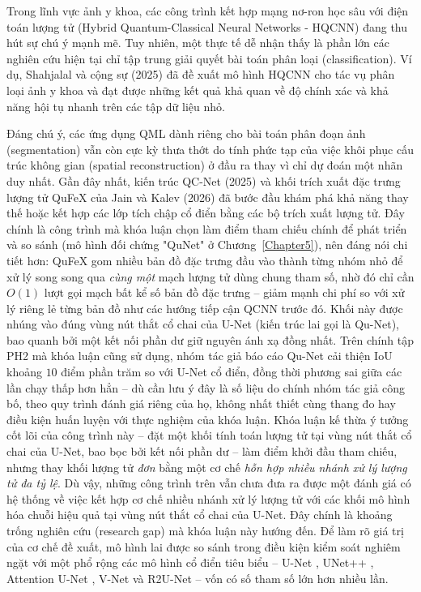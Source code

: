 Trong lĩnh vực ảnh y khoa, các công trình kết hợp mạng nơ-ron học sâu với điện toán lượng tử (Hybrid Quantum-Classical Neural Networks - HQCNN) đang thu hút sự chú ý mạnh mẽ. Tuy nhiên, một thực tế dễ nhận thấy là phần lớn các nghiên cứu hiện tại chỉ tập trung giải quyết bài toán phân loại (classification). Ví dụ, Shahjalal và cộng sự (2025) \cite{shahjalal2025hqcnn} đã đề xuất mô hình HQCNN cho tác vụ phân loại ảnh y khoa và đạt được những kết quả khả quan về độ chính xác và khả năng hội tụ nhanh trên các tập dữ liệu nhỏ.

Đáng chú ý, các ứng dụng QML dành riêng cho bài toán phân đoạn ảnh (segmentation) vẫn còn cực kỳ thưa thớt do tính phức tạp của việc khôi phục cấu trúc không gian (spatial reconstruction) ở đầu ra thay vì chỉ dự đoán một nhãn duy nhất. Gần đây nhất, kiến trúc QC-Net (2025) \cite{long2025qcq} và khối trích xuất đặc trưng lượng tử QuFeX của Jain và Kalev (2026) \cite{qufex2025} đã bước đầu khám phá khả năng thay thế hoặc kết hợp các lớp tích chập cổ điển bằng các bộ trích xuất lượng tử. Đây chính là công trình mà khóa luận chọn làm điểm tham chiếu chính để phát triển và so sánh (mô hình đối chứng "QuNet" ở Chương~\ref{Chapter5}), nên đáng nói chi tiết hơn: QuFeX gom nhiều bản đồ đặc trưng đầu vào thành từng nhóm nhỏ để xử lý song song qua \emph{cùng một} mạch lượng tử dùng chung tham số, nhờ đó chỉ cần $O(1)$ lượt gọi mạch bất kể số bản đồ đặc trưng -- giảm mạnh chi phí so với xử lý riêng lẻ từng bản đồ như các hướng tiếp cận QCNN trước đó. Khối này được nhúng vào đúng vùng nút thắt cổ chai của U-Net (kiến trúc lai gọi là Qu-Net), bao quanh bởi một kết nối phần dư giữ nguyên ánh xạ đồng nhất. Trên chính tập PH2 mà khóa luận cũng sử dụng, nhóm tác giả báo cáo Qu-Net cải thiện IoU khoảng $10$ điểm phần trăm so với U-Net cổ điển, đồng thời phương sai giữa các lần chạy thấp hơn hẳn -- dù cần lưu ý đây là số liệu do chính nhóm tác giả công bố, theo quy trình đánh giá riêng của họ, không nhất thiết cùng thang đo hay điều kiện huấn luyện với thực nghiệm của khóa luận. Khóa luận kế thừa ý tưởng cốt lõi của công trình này -- đặt một khối tính toán lượng tử tại vùng nút thắt cổ chai của U-Net, bao bọc bởi kết nối phần dư -- làm điểm khởi đầu tham chiếu, nhưng thay khối lượng tử \emph{đơn} bằng một cơ chế \emph{hỗn hợp nhiều nhánh xử lý lượng tử đa tỷ lệ}. Dù vậy, những công trình trên vẫn chưa đưa ra được một đánh giá có hệ thống về việc kết hợp cơ chế nhiều nhánh xử lý lượng tử với các khối mô hình hóa chuỗi hiệu quả tại vùng nút thắt cổ chai của U-Net. Đây chính là khoảng trống nghiên cứu (research gap) mà khóa luận này hướng đến. Để làm rõ giá trị của cơ chế đề xuất, mô hình lai được so sánh trong điều kiện kiểm soát nghiêm ngặt với một phổ rộng các mô hình cổ điển tiêu biểu -- U-Net \cite{ronneberger2015unet}, UNet++ \cite{zhou2018unetplusplus}, Attention U-Net \cite{oktay2018attention}, V-Net \cite{milletari2016vnet} và R2U-Net \cite{alom2018r2unet} -- vốn có số tham số lớn hơn nhiều lần.

